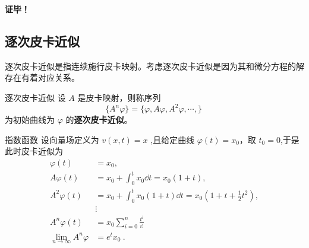 \textbf{证毕！}
\subsection{逐次皮卡近似}
逐次皮卡近似是指连续施行皮卡映射。考虑逐次皮卡近似是因为其和微分方程的解存在有着对应关系。
\begin{definition}{逐次皮卡近似}
设 $A$ 是皮卡映射，则称序列
\begin{equation}
\{A^n\varphi\}=\{\varphi, A\varphi, A^2\varphi,\cdots,\}~ 
\end{equation}
为初始曲线为 $\varphi$ 的\textbf{逐次皮卡近似}。
\end{definition}

\begin{example}{指数函数}
设向量场定义为 $v(x,t)=x$ ,且给定曲线 $\varphi(t)=x_0$，取 $t_0=0$,于是此时皮卡近似为
\begin{equation}
\begin{aligned}
\varphi(t)&=x_0,\\
A\varphi(t)&=x_0+\int_{0}^{t}x_0\dd t=x_0(1+t),\\
A^2\varphi(t)&=x_0+\int_{0}^{t}x_0(1+t)\dd t=x_0(1+t+\frac{1}{2}t^2),\\
&\vdots\\
A^n\varphi(t)&=x_0\sum_{i=0}^n\frac{t^i}{i!}\\
\lim_{n\rightarrow\infty}A^n\varphi&=e^tx_0
~.
\end{aligned}
\end{equation}
\end{example}
